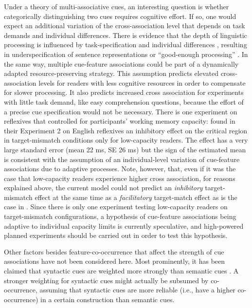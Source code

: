 \documentclass{cambridge7A}\usepackage[]{graphicx}\usepackage[]{color}
\begin{document}
Under a theory of multi-associative cues, an interesting question is whether categorically distinguishing two cues requires cognitive effort. If so, one would expect an additional variation of the cross-association level that depends on task demands and individual differences.
There is evidence that the depth of linguistic processing is influenced by task-specification \citep{SwetsDesmetClifton2008,LogacevVasishth2015} and individual differences \citep{Traxler2007,MalsburgVasishth2013,NicenboimEtAlFrontiers2016Capacity}, resulting in underspecification of sentence representations or ``good-enough processing'' \citep{FerreiraFerraroBailey2002}.
In the same way, multiple cue-feature associations could be part of a dynamically adapted resource-preserving strategy. 
This assumption predicts elevated cross-association levels for readers with less cognitive resources in order to compensate for slower processing. It also predicts increased cross association for experiments with little task demand, like easy comprehension questions, because the effort of a precise cue specification would not be necessary.
There is one experiment on reflexives that controlled for participants'  working memory capacity: \cite{CunningsFelser2013} found in their Experiment 2 on English reflexives an inhibitory effect on the critical region in target-mismatch conditions only for low-capacity readers. The effect has a very large standard error (mean 22 ms, SE 26 ms) but the sign of the estimated mean is consistent with the assumption of an individual-level variation of cue-feature associations due to adaptive processes. 
Note, however, that, even if it was the case that low-capacity readers experience higher cross association, for reasons explained above, the current model could not predict an \textit{inhibitory} target-mismatch effect at the same time as a \textit{facilitatory} target-match effect as is the case in \cite{CunningsFelser2013}.
Since there is only one experiment testing low-capacity readers on target-mismatch configurations, a hypothesis of cue-feature associations being adaptive to individual capacity limits is currently speculative, and high-powered planned experiments should be carried out in order to test this hypothesis.

Other factors besides feature-co-occurrence that affect the strength of cue associations have not been considered here.
Most prominently, it has been claimed that syntactic cues are weighted more strongly than semantic cues  \citep[e.g.,][]{Nicol1988, Sturt2003,VanDyke2007,VanDykeMcElree2011}. 
A stronger weighting for syntactic cues might actually be subsumed by co-occurrence, assuming that syntactic cues are more reliable (i.e., have a higher co-occurrence) in a certain construction than semantic cues.
\end{document}
